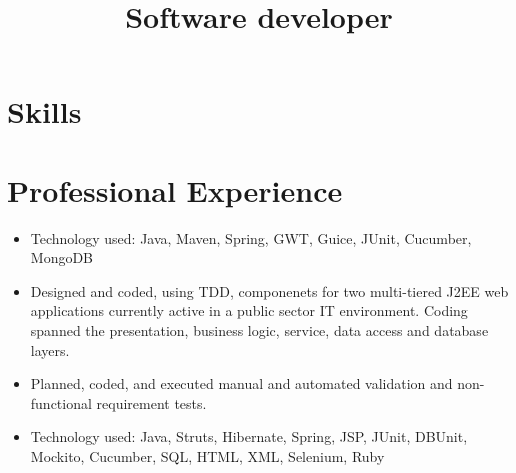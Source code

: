 \documentclass[11pt,letterpaper,sans]{moderncv}   %
\title{Software developer}               %
\begin{document}
\maketitle


\section{Skills}


\section{Professional Experience}

{\begin{itemize}%
\item Technology used: Java, Maven, Spring, GWT, Guice, JUnit, Cucumber, MongoDB
\end{itemize}}
\vspace{11pt}

{\begin{itemize}%
\item Designed and coded, using TDD, componenets for two multi-tiered
J2EE web applications currently active in a public sector IT environment.
Coding spanned the presentation, business logic, service, data access and
database layers.
\item Planned, coded, and executed manual and automated validation and
non-functional requirement tests.
\item Technology used: Java, Struts, Hibernate, Spring, JSP, JUnit,
DBUnit, Mockito, Cucumber, SQL, HTML, XML, Selenium, Ruby
\end{itemize}}
\vspace{11pt}
\end{document}
